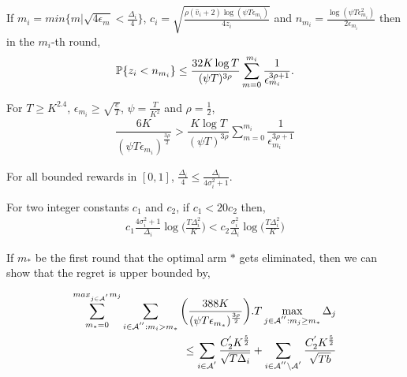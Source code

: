 \begin{lemma}
\label{proofTheorem:Lemma:5}
If $m_i = min\lbrace m|\sqrt{4\epsilon_{m} } < \frac{\Delta_i}{4} \rbrace $, $c_{i} =\sqrt{\frac{\rho (\hat{v}_i + 2)\log (\psi T\epsilon_{m_{i}})}{4 z_i}}$ and $n_{m_i}=\frac{\log{(\psi T\epsilon_{m_{i}}^{2})}}{2\epsilon_{m_{i}}}$ then in the $m_i$-th round, 
\begin{align*}
\mathbb{P}\lbrace z_i < n_{m_i} \rbrace \leq \dfrac{32K\log T}{(\psi T)^{3\rho}}\sum_{m=0}^{m_i}\dfrac{1}{\epsilon_{m_i}^{3\rho + 1}}.
\end{align*}
\end{lemma}



\begin{lemma}
\label{proofTheorem:Lemma:6}
For $T\geq K^{2.4}$, $\epsilon_{m_i}\geq \sqrt{\frac{e}{T}}$, $\psi=\frac{T}{K^2}$ and $\rho=\frac{1}{2}$,  
\begin{align*}
\dfrac{6K}{(\psi T \epsilon_{m_i})^{\frac{3\rho}{2}}} > \dfrac{K\log T}{(\psi T)^{3\rho}}\sum_{m=0}^{m_i}\dfrac{1}{\epsilon_{m_i}^{3\rho + 1}}
\end{align*}
\end{lemma}



\begin{lemma}
\label{proofTheorem:Lemma:7}
For all bounded rewards in $[0,1]$, $\frac{\Delta_i}{4} \leq \frac{\Delta_i}{4\sigma_i^2 + 1} $.
\end{lemma}



\begin{lemma}
\label{proofTheorem:Lemma:8}
For two integer constants $c_1$ and $c_2$, if $c_1 < 20 c_2$ then,
\begin{align*}
c_1 \frac{4\sigma_i^2 + 1}{\Delta_i}\log\bigg( \frac{T\Delta_i^2}{K}\bigg) < c_2 \frac{\sigma_i^2}{\Delta_i}\log\bigg( \frac{T\Delta_i^2}{K}\bigg)
\end{align*}
\end{lemma}


\begin{lemma}
\label{proofTheorem:Lemma:9}
If $m_*$ be the first round that the optimal arm $*$ gets eliminated, then we can show that the regret is upper bounded by,

\begin{align*}
\sum_{m_{*}=0}^{max_{j\in \mathcal{A}^{'}}m_{j}}\sum_{i\in \mathcal{A}^{''}:m_{i}>m_{*}}\bigg(\dfrac{388 K}{(\psi  T\epsilon_{m_{*}})^{\frac{3\rho}{2}}} \bigg).T\max_{j\in \mathcal{A}^{''}:m_{j}\geq m_{*}}{\Delta}_{j} \\
 \leq\sum_{i\in \mathcal{A}^{'}}\dfrac{C_2^{'} K^{\frac{5}{2}}}{\sqrt{T\Delta_i}} +\sum_{i\in \mathcal{A}^{''}\setminus \mathcal{A}^{'}}\dfrac{C_2^{'} K^{\frac{5}{2}}}{\sqrt{T b}}
\end{align*}

\end{lemma}



